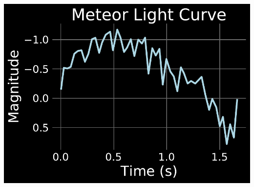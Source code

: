 \documentclass{fancyslides}
\begin{document}
\begin{frame}
\center
\includegraphics[width=.7\linewidth]{D6Curve.pdf}
\end{frame}






\end{document}
